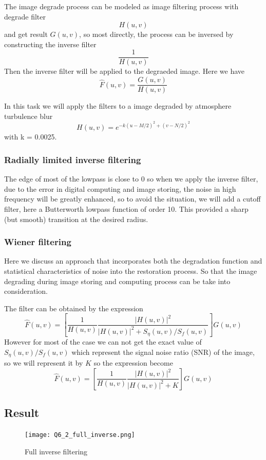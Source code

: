 \documentclass[
	12pt, %
]{style/fphw}
\begin{document}
The image degrade process can be modeled as image filtering process with degrade filter $$H(u, v)$$ and get result $G(u, v)$, so most directly, the process can be inversed by constructing the inverse filter $$\frac{1}{H(u, v)}$$ Then the inverse filter will be applied to the degraeded image. Here we have $$\widehat{F}(u, v) = \frac{G(u, v)}{H(u, v)}$$ 

In this task we will apply the filters to a image degraded by atmosphere turbulence blur $$H(u, v) = e^{-k(u-M/2)^2+(v-N/2)^2}$$ with k = 0.0025.

\subsubsection*{Radially limited inverse filtering}

The edge of most of the lowpass is close to 0 so when we apply the inverse filter, due to the error in digital computing and image storing, the noise in high frequency will be greatly enhanced, so to avoid the situation, we will add a cutoff filter, here a Butterworth lowpass function of order 10. This provided a sharp (but smooth) transition at the desired radius.

\subsubsection*{Wiener filtering}

Here we discuss an approach that incorporates both the degradation function and statistical characteristics of noise into the restoration process. So that the image degrading during image storing and computing process can be take into consideration.

The filter can be obtained by the expression $$\widehat{F}(u, v)=[\frac{1}{H(u, v)} \frac{|H(u, v)|^2}{|H(u, v)|^2+S_\eta (u, v)/ S_f (u, v)}]G(u, v)$$ However for most of the case we can not get the exact value of $S_\eta (u, v)/ S_f (u, v)$ which represent the signal noise ratio (SNR) of the image, so we will represent it by $K$ so the expression become $$\widehat{F}(u, v)=[\frac{1}{H(u, v)} \frac{|H(u, v)|^2}{|H(u, v)|^2 + K}]G(u, v)$$

\subsection*{Result}

\begin{figure}[H]
	\centering
	\texttt{[image: Q6\_2\_full\_inverse.png]}
	\caption{Full inverse filtering}
	\label{Q6_2_full_inverse}
\end{figure}
\end{document}

